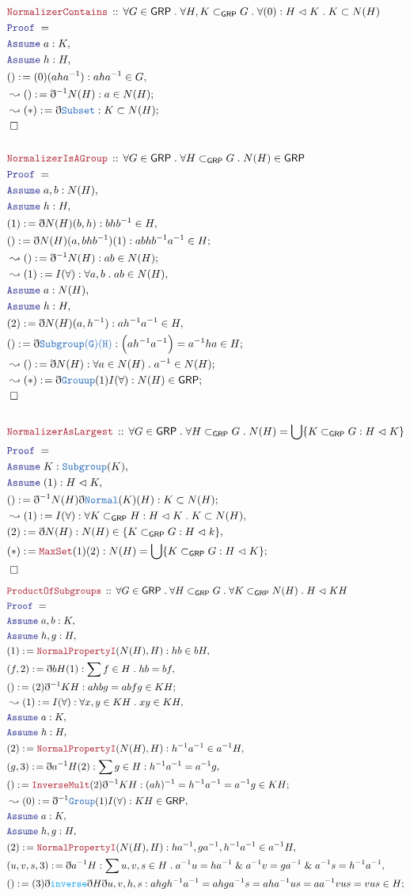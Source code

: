 \documentclass[12pt]{scrartcl}
\newcommand{\TYPE}[1]{\textcolor{NavyBlue}{\mathtt{#1}}}
\newcommand{\FUNC}[1]{\textcolor{Cerulean}{\mathtt{#1}}}
\newcommand{\LOGIC}[1]{\textcolor{Blue}{\mathtt{#1}}}
\newcommand{\THM}[1]{\textcolor{Maroon}{\mathtt{#1}}}
\renewcommand{\.}{\; . \;}
\newcommand{\de}{: \kern 0.1pc =}
\newcommand{\Theorem}[2]{& \THM{#1} \, :: \, #2 \\ & \Proof = \\ }
\newcommand{\Page}[1]{ \begin{align*} #1 \end{align*}   }
\newcommand{ \bd }{ \ByDef }
\renewcommand{\And}{\; \& \;}
\newcommand{\Say}[3]{& #1 \de #2 : #3, \\}
\newcommand{\Conclude}[3]{& #1 \de #2 : #3; \\}
\newcommand{\Derive}[3]{& \leadsto #1 \de #2 : #3, \\}
\newcommand{\DeriveConclude}[3]{& \leadsto #1 \de #2 : #3 ; \\}
\newcommand{\Assume}[2]{& \LOGIC{Assume} \; #1 : #2, \\}
\newcommand{\QED}{\; \square}
\newcommand{\EndProof}{& \QED \\}
\newcommand{\ByDef}{\eth}
\newcommand{\Proof}{\LOGIC{Proof} \; }
\newcommand{\Sgrp}{\subset_{\mathsf{GRP}}}
\newcommand{\Nrml}{\vartriangleleft}
\newcommand{\GRP}{\mathsf{GRP}}
\begin{document}
\Page{
	\Theorem{NormalizerContains}{\forall G \in \GRP \. \forall H,K \Sgrp G \. \forall (0) : H \Nrml K \. K \subset N(H)}
	\Assume{a}{K}
	\Assume{h}{H}
	\Say{()}{(0)(aha^{-1})}{ aha^{-1} \in G}
	\DeriveConclude{()}{\bd^{-1}N(H)}{a \in N(H)}
	\DeriveConclude{(*)}{\bd \TYPE{Subset} }{ K \subset N(H)}
	\EndProof
	\\
	\Theorem{NormalizerIsAGroup}{\forall G \in \GRP \. \forall H \Sgrp G \. N(H) \in \GRP}
	\Assume{a,b}{N(H)}
	\Assume{h}{H}
	\Say{(1)}{\bd N(H)(b,h)}{ bhb^{-1} \in H }
	\Conclude{()}{\bd N(H)(a,bhb^{-1})(1)}{abhb^{-1}a^{-1} \in H}
	\DeriveConclude{()}{\bd^{-1} N(H)}{ab \in N(H)}
	\Derive{(1)}{I(\forall)}{\forall a,b \. ab  \in N(H) }
	\Assume{a}{N(H)}
	\Assume{h}{H}
	\Say{(2)}{ \bd N(H)(a,h^{-1}) }{ah^{-1}a^{-1} \in H}
	\Conclude{()}{\bd \TYPE{Subgroup(G)(H)}}{ \Big( ah^{-1}a^{-1} \Big) = a^{-1}ha \in H     }
	\DeriveConclude{()}{\bd N(H)}{ \forall a \in N(H) \. a^{-1} \in N(H) }
	\DeriveConclude{(*)}{\bd \TYPE{Grouup}(1)I(\forall) }{ N(H) \in \GRP }
	\EndProof
	\\
	\Theorem{NormalizerAsLargest}{\forall G \in \GRP \. \forall H \Sgrp G \. N(H) = \bigcup \{ K \Sgrp G : H \Nrml K\}}
	\Assume{K}{\TYPE{Subgroup}(K)}
	\Assume{(1)}{H \Nrml K}
	\Conclude{()}{\bd^{-1} N(H)\bd \TYPE{Normal}(K)(H)}{K \subset N(H)}
	\Derive{(1)}{I(\forall)}{\forall K \Sgrp H : H \Nrml K \. K \subset N(H) }
	\Say{(2)}{\bd N(H)}{ N(H) \in \{ K \Sgrp G : H \Nrml k \}      }
	\Conclude{(*)}{\THM{MaxSet}(1)(2)}{ N(H) = \bigcup \{ K \Sgrp G : H \Nrml K \}}
	\EndProof
}\Page{
	\Theorem{ProductOfSubgroups}{\forall G \in \GRP \. \forall H \Sgrp G \. \forall K \Sgrp N(H) \.  H \Nrml KH }
	\Assume{a,b}{K}
	\Assume{h,g}{H}
	\Say{ (1)}{\THM{NormalPropertyI}(N(H),H)}{hb \in bH}
	\Say{(f,2)}{ \bd bH(1)}{\sum f \in H \. hb = bf}
	\Conclude{()}{(2)\bd^{-1} KH}{ahbg = abfg \in KH}
	\Derive{(1)}{ I(\forall)}{ \forall x,y \in  KH \. xy \in KH    }
	\Assume{a}{K}
	\Assume{h}{H}
	\Say{(2)}{\THM{NormalPropertyI}(N(H),H)}{h^{-1}a^{-1} \in a^{-1}H}
	\Say{(g,3)}{\bd a^{-1}H (2)}{ \sum g \in H : h^{-1}a^{-1} = a^{-1}g }
	\Conclude{ () }{ \THM{InverseMult}(2)  \bd^{-1}KH}{ (ah)^{-1} = h^{-1}a^{-1} = a^{-1}g \in KH }
	\Derive{(0)}{\bd^{-1}\TYPE{Group}(1)I(\forall)}{KH \in \GRP}
	\Assume{a}{K}
	\Assume{h,g}{H}
	\Say{ (2)}{\THM{NormalPropertyI}(N(H),H)}{ ha^{-1}, ga^{-1},h^{-1}a^{-1}  \in a^{-1}H}
	\Say{(u,v,s,3)}{\bd a^{-1}H}{ \sum u,v,s \in H \. a^{-1}u = ha^{-1} \And a^{-1}v = ga^{-1} \And a^{-1}s = h^{-1}a^{-1}}
	\Conclude{()}{(3)\bd \FUNC{inverse}\bd H \bd u,v,h,s}
	{  ahgh^{-1}a^{-1} = ahga^{-1}s = aha^{-1}us = aa^{-1}vus = vus \in H   }
}
\end{document}
